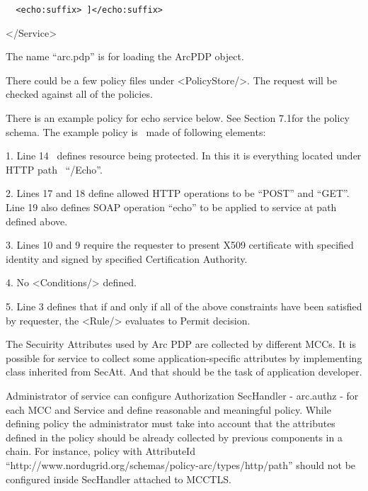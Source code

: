 \documentclass{article}
\begin{document}
{\upshape\color{black}
\foreignlanguage{spanish}{\texttt{\ \ }}\texttt{{\textless}echo:suffix{\textgreater}
]{\textless}/echo:suffix{\textgreater}}}

{\ttfamily\color{black}
{\textless}/Service{\textgreater}}

{\color{black}
The name {\textquotedblleft}arc.pdp{\textquotedblright} is for loading
the ArcPDP object.}

{\color{black}
There could be a few policy files under
{\textless}PolicyStore/{\textgreater}. The request will be checked
against all of the policies.}

{\upshape\color{black}
There is an example policy for echo service below. See Section 7.1for
the policy schema. The example policy is \ made of following elements:
}

{\color{black}
1. Line 14 \ defines resource being protected. In this it is everything
located under HTTP path
\ {\textquotedblleft}/Echo{\textquotedblright}.}

{\color{black}
2. Lines 17 and 18 define allowed HTTP operations to be
{\textquotedblleft}POST{\textquotedblright} and
{\textquotedblleft}GET{\textquotedblright}. Line 19 also defines SOAP
operation {\textquotedblleft}echo{\textquotedblright} to be applied to
service at path defined above.}

{\color{black}
3. Lines 10 and 9 require the requester to present X509 certificate with
specified identity and signed by specified Certification Authority.}

{\color{black}
4. No {\textless}Conditions/{\textgreater} defined.}

{\color{black}
5. Line 3 defines that if and only if all of the above constraints have
been satisfied by requester, the {\textless}Rule/{\textgreater}
evaluates to Permit decision.}

{\color{black}
The Secuirity Attributes used by Arc PDP are collected by different
MCCs. It is possible for service to collect some application-specific
attributes by implementing class inherited from SecAtt. And that should
be the task of application developer.}

{\upshape\color{black}
Administrator of service can configure Authorization SecHandler -
arc.authz - for each MCC and Service and define reasonable and
meaningful policy. While defining policy the administrator must take
into account that the attributes defined in the policy should be
already collected by previous components in a chain. For instance,
policy with AttributeId
{\textquotedblleft}http://www.nordugrid.org/schemas/policy-arc/types/http/path{\textquotedblright}
should not be configured inside SecHandler attached to MCCTLS. }
\end{document}
